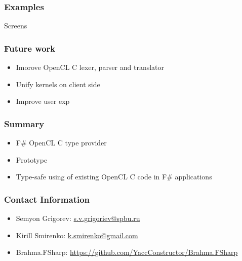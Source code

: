 \documentclass[xcolor=table]{beamer}
\begin{document}
            
\begin{frame}
  \transwipe[direction=90]
  \frametitle{Examples}         
  Screens
\end{frame}     

\begin{frame}
  \transwipe[direction=90]
  \frametitle{Future work}         
\begin{itemize}
\item Imorove OpenCL C lexer, parser and  translator
\item Unify kernels on client side
\item Improve user exp
\end{itemize}
\end{frame}     
            
            
\begin{frame}
  \transwipe[direction=90]
  \frametitle{Summary}         
\begin{itemize}
\item F\# OpenCL C type provider
\item Prototype
\item Type-safe using of existing OpenCL C code in F\# applications
\end{itemize}
\end{frame}           
            
\begin{frame}
\transwipe[direction=90]
\frametitle{Contact Information}
\begin{itemize}
  \item Semyon Grigorev: \href{mailto:s.v.grigoriev@spbu.ru}{s.v.grigoriev@spbu.ru}
  \item Kirill Smirenko: \href{mailto:k.smirenko@gmail.com}{k.smirenko@gmail.com}
\end{itemize}
\begin{itemize}
  \item Brahma.FSharp: \href{https://github.com/YaccConstructor/Brahma.FSharp}{https://github.com/YaccConstructor/Brahma.FSharp}
\end{itemize}
\hspace{2cm}
\end{frame}
\end{document}
